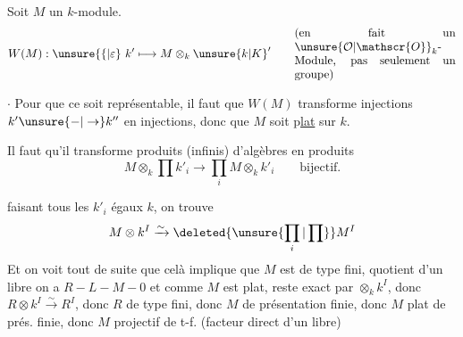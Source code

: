 
Soit $M$ un $k$-module.
\[
 W(M):\unsure{\{|\varepsilon}\ k'\longmapsto M\otimes_k \unsure{k|K}'
 \qquad\text{\parbox{.4\linewidth}{(en fait un $\unsure{\mathcal{O}|\mathscr{O}}_k$-Module, pas seulement un groupe)}}
\]

$\cdot$ Pour que ce soit représentable, il faut que $W(M)$ transforme injections $k'\unsure{-|\to} k''$ en injections, donc que $M$ soit p\uline{lat} sur $k$. 

Il faut qu'il transforme produits (infinis) d'algèbres en produits
\[
 M\otimes_k\prod k'_i\longrightarrow\prod_i M\otimes_k k'_i
 \qquad\text{bijectif.}
\]

 faisant tous les $k'_i$ égaux  $k$, on trouve
\[
 M\otimes k^I\xrightarrow{\sim}\deleted{\unsure{\prod_i|\prod}} M^I
\]
Et on voit tout de suite que celà implique que $M$ est de type fini,   quotient d'un libre    on a $R\mathrel{-}L\mathrel{-}M\mathrel{-}0$
et comme $M$ est plat,  reste exact par $\otimes_k k^I$, donc $R\otimes k^I\xrightarrow{\sim}R^I$, donc $R$ de type fini, donc $M$ de présentation finie, donc $M$ plat de prés. finie, donc $M$ projectif de t-f. (facteur direct d'un libre)


